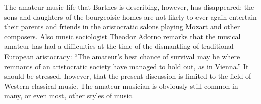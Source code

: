 \documentclass[11pt]{article}
\begin{document}
The amateur music life that Barthes is describing, however, has disappeared: the sons and daughters of the bourgeoisie homes are not likely to ever again entertain their parents and friends in the aristocratic salons playing Mozart and other composers. Also music sociologist Theodor Adorno remarks that the musical amateur has had a difficulties at the time of the dismantling of traditional European aristocracy: ``The amateur's best chance of survival may be where remnants of an aristocratic society have managed to hold out, as in Vienna.''  \citep[p.6]{adorno76} It should be stressed, however, that the present discussion is limited to the field of Western classical music. The amateur musician is obviously still common  in many, or even most, other styles of music.
\end{document}
